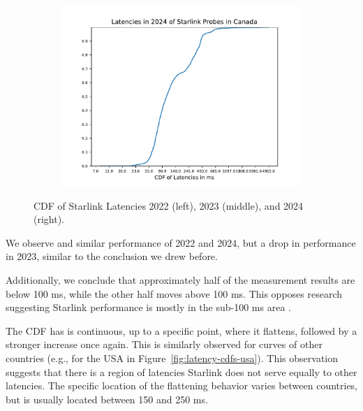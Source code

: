 \begin{figure}
\begin{subfigure}[b]{0.3\linewidth}
		\includegraphics[width=\linewidth]{chapters/4-results/latency/img/cdf_latencies_in_2024_of_starlink_probes_in_canada.pdf}
	\end{subfigure}
	\caption{CDF of Starlink Latencies 2022 (left), 2023 (middle), and 2024 (right).}
	\label{fig:latency-cdfs-canada}
\end{figure}

We observe and similar performance of 2022 and 2024, but a drop in performance in 2023, similar to the conclusion we drew before.

Additionally, we conclude that approximately half of the measurement results are below 100 ms, while the other half moves above 100 ms. This opposes research suggesting Starlink performance is mostly in the sub-100 ms area \cite{DBLP:conf/www/MohanFCBRMO24, DBLP:conf/icnp/LaiLL20, DBLP:journals/pacmnet/RamanVCSZ23, DBLP:conf/imc/MichelTGB22}.

The CDF has is continuous, up to a specific point, where it flattens, followed by a stronger increase once again. This is similarly observed for curves of other countries (e.g., for the USA in Figure~\ref{fig:latency-cdfs-usa}). This observation suggests that there is a region of latencies Starlink does not serve equally to other latencies. The specific location of the flattening behavior varies between countries, but is usually located between 150 and 250 ms.

